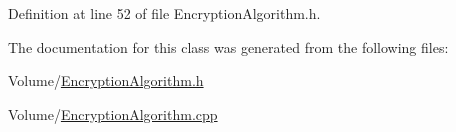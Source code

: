 Definition at line 52 of file Encryption\+Algorithm.\+h.



The documentation for this class was generated from the following files\+:\begin{DoxyCompactItemize}
\item 
Volume/\hyperlink{_encryption_algorithm_8h}{Encryption\+Algorithm.\+h}\item 
Volume/\hyperlink{_encryption_algorithm_8cpp}{Encryption\+Algorithm.\+cpp}\end{DoxyCompactItemize}
